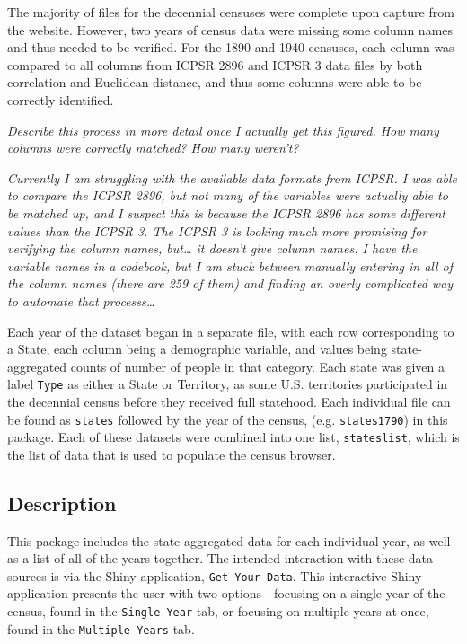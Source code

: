 \documentclass[11pt,]{article}
\begin{document}
The majority of files for the decennial censuses were complete upon
capture from the website. However, two years of census data were missing
some column names and thus needed to be verified. For the 1890 and 1940
censuses, each column was compared to all columns from ICPSR 2896 and
ICPSR 3 data files by both correlation and Euclidean distance, and thus
some columns were able to be correctly identified.

\emph{Describe this process in more detail once I actually get this
figured. How many columns were correctly matched? How many weren't?}

\emph{Currently I am struggling with the available data formats from
ICPSR. I was able to compare the ICPSR 2896, but not many of the
variables were actually able to be matched up, and I suspect this is
because the ICPSR 2896 has some different values than the ICPSR 3. The
ICPSR 3 is looking much more promising for verifying the column names,
but\ldots{} it doesn't give column names. I have the variable names in a
codebook, but I am stuck between manually entering in all of the column
names (there are 259 of them) and finding an overly complicated way to
automate that processs\ldots{}}

Each year of the dataset began in a separate file, with each row
corresponding to a State, each column being a demographic variable, and
values being state-aggregated counts of number of people in that
category. Each state was given a label \texttt{Type} as either a State
or Territory, as some U.S. territories participated in the decennial
census before they received full statehood. Each individual file can be
found as \texttt{states} followed by the year of the census, (e.g.
\texttt{states1790}) in this package. Each of these datasets were
combined into one list, \texttt{stateslist}, which is the list of data
that is used to populate the census browser.

\subsection{Description}

This package includes the state-aggregated data for each individual
year, as well as a list of all of the years together. The intended
interaction with these data sources is via the Shiny application,
\texttt{Get\ Your\ Data}. This interactive Shiny application presents
the user with two options - focusing on a single year of the census,
found in the \texttt{Single\ Year} tab, or focusing on multiple years at
once, found in the \texttt{Multiple\ Years} tab.
\end{document}
